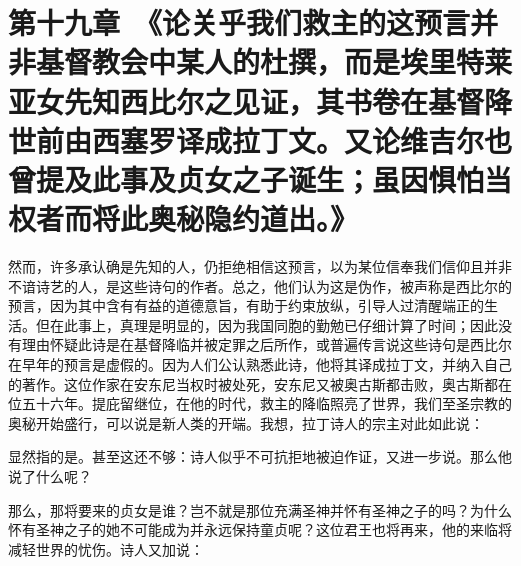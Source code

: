 
\section{第十九章　《论关乎我们救主的这预言并非基督教会中某人的杜撰，而是埃里特莱亚女先知西比尔之见证，其书卷在基督降世前由西塞罗译成拉丁文。又论维吉尔也曾提及此事及贞女之子诞生；虽因惧怕当权者而将此奥秘隐约道出。》}

然而，许多承认确是先知的人，仍拒绝相信这预言，以为某位信奉我们信仰且并非不谙诗艺的人，是这些诗句的作者。总之，他们认为这是伪作，被声称是西比尔的预言，因为其中含有有益的道德意旨，有助于约束放纵，引导人过清醒端正的生活。但在此事上，真理是明显的，因为我国同胞的勤勉已仔细计算了时间；因此没有理由怀疑此诗是在基督降临并被定罪之后所作，或普遍传言说这些诗句是西比尔在早年的预言是虚假的。因为人们公认熟悉此诗，他将其译成拉丁文，并纳入自己的著作。这位作家在安东尼当权时被处死，安东尼又被奥古斯都击败，奥古斯都在位五十六年。提庇留继位，在他的时代，救主的降临照亮了世界，我们至圣宗教的奥秘开始盛行，可以说是新人类的开端。我想，拉丁诗人的宗主对此如此说：\par

\par

\par

\par

显然指的是。甚至这还不够：诗人似乎不可抗拒地被迫作证，又进一步说。那么他说了什么呢？\par

\par

那么，那将要来的贞女是谁？岂不就是那位充满圣神并怀有圣神之子的吗？为什么怀有圣神之子的她不可能成为并永远保持童贞呢？这位君王也将再来，他的来临将减轻世界的忧伤。诗人又加说：\par

\par

